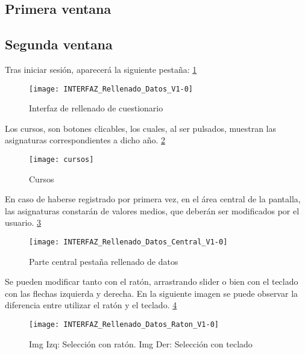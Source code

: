 \subsection{Primera ventana}

\subsection{Segunda ventana}
Tras iniciar sesión, aparecerá la siguiente pestaña: \ref{fig:E.2.1}
\begin{figure}[h]
\centering
\texttt{[image: INTERFAZ\_Rellenado\_Datos\_V1-0]}
\caption{Interfaz de rellenado de cuestionario}
\label{fig:E.2.1}
\end{figure}
Los cursos, son botones clicables, los cuales, al ser pulsados, muestran las asignaturas correspondientes a dicho año. \ref{fig:E.2.2}
\begin{figure}[h]
\centering
\texttt{[image: cursos]}
\caption{Cursos}
\label{fig:E.2.2}
\end{figure}

En caso de haberse registrado por primera vez, en el área central de la pantalla, las asignaturas constarán de valores medios, que deberán ser modificados por el usuario. \ref{fig:E.2.3}
\begin{figure}[h]
\centering
\texttt{[image: INTERFAZ\_Rellenado\_Datos\_Central\_V1-0]}
\caption{Parte central pestaña rellenado de datos}
\label{fig:E.2.3}
\end{figure}
Se pueden modificar tanto con el ratón, arrastrando  slider o bien con el teclado con las flechas izquierda y derecha. En la siguiente imagen se puede observar la diferencia entre utilizar el ratón y el teclado. \ref{fig:E.2.4}
\begin{figure}[h]
\centering
\texttt{[image: INTERFAZ\_Rellenado\_Datos\_Raton\_V1-0]}
\caption{Img Izq: Selección con ratón. Img Der: Selección con teclado}
\label{fig:E.2.4}
\end{figure}
